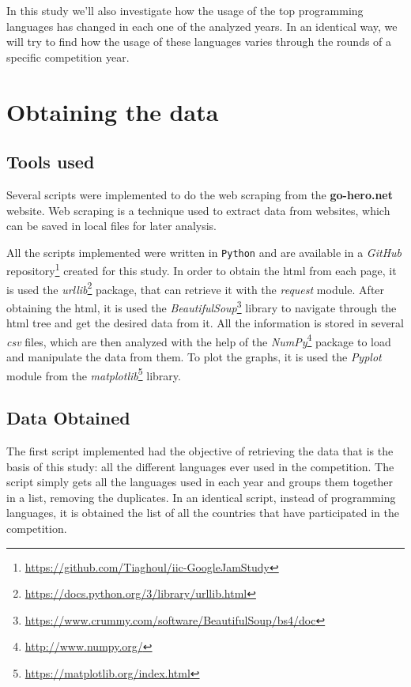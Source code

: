 \documentclass{article}
\begin{document}
\begin{multicols*}{2}
In this study we'll also investigate how the usage of the top programming languages has changed in each one of the analyzed years. In an identical way, we will try to find how the usage of these languages varies through the rounds of a specific competition year.





\section{Obtaining the data}

\subsection{Tools used}

Several scripts were implemented to do the web scraping from the \textbf{go-hero.net} website. Web scraping is a technique used to extract data from websites\cite{web_sc}, which can be saved in local files for later analysis.

All the scripts implemented were written in \texttt{Python} and are available in a \textit{GitHub} repository\footnote{\url{https://github.com/Tiaghoul/iic-GoogleJamStudy}} created for this study. In order to obtain the html from each page, it is used the \textit{urllib}\footnote{\url{https://docs.python.org/3/library/urllib.html}} package, that can retrieve it with the \textit{request} module. After obtaining the html, it is used the \textit{BeautifulSoup}\footnote{\url{https://www.crummy.com/software/BeautifulSoup/bs4/doc}} library to navigate through the html tree and get the desired data from it. All the information is stored in several \textit{csv} files, which are then analyzed with the help of the \textit{NumPy}\footnote{\url{http://www.numpy.org/}} package to load and manipulate the data from them. To plot the graphs, it is used the \textit{Pyplot} module from the \textit{matplotlib}\footnote{\url{https://matplotlib.org/index.html}} library.



\subsection{Data Obtained}

The first script implemented had the objective of retrieving the data that is the basis of this study: all the different languages ever used in the competition. The script simply gets all the languages used in each year and groups them together in a list, removing the duplicates. In an identical script, instead of programming languages, it is obtained the list of all the countries that have participated in the competition.


\end{multicols*}
\end{document}
